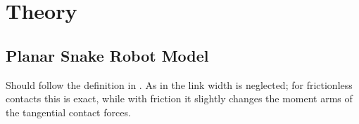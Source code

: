 \chapter{Theory}
\label{chap:theory}

%
%

\section{Planar Snake Robot Model}
\label{sec:snake-model}

Should follow the definition in \textcite{gravdahl2026formclosure}.
As in \cite{gravdahl2026formclosure,nordal2026grip} the link width is
neglected; for frictionless contacts this is exact, while with friction it
slightly changes the moment arms of the tangential contact forces.

